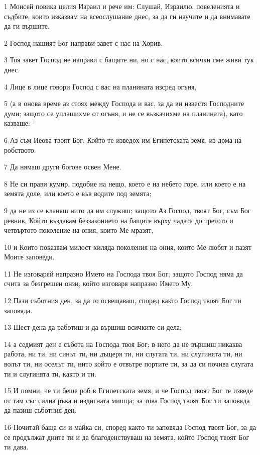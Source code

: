 \par 1 Моисей повика целия Израил и рече им: Слушай, Израилю, повеленията и съдбите, които изказвам на всеослушание днес, за да ги научите и да внимавате да ги вършите.
\par 2 Господ нашият Бог направи завет с нас на Хорив.
\par 3 Тоя завет Господ не направи с бащите ни, но с нас, които всички сме живи тук днес.
\par 4 Лице в лице говори Господ с вас на планината изсред огъня,
\par 5 (а в онова време аз стоях между Господа и вас, за да ви известя Господните думи; защото се уплашихме от огъня, и не се възкачихме на планината), като казваше: -
\par 6 Аз съм Иеова твоят Бог, Който те изведох им Египетската земя, из дома на робството.
\par 7 Да нямаш други богове освен Мене.
\par 8 Не си прави кумир, подобие на нещо, което е на небето горе, или което е на земята доле, или което е във водите под земята;
\par 9 да не из се кланяш нито да им служиш; защото Аз Господ, твоят Бог, съм Бог ревнив, Който въздавам беззаконието на бащите върху чадата до третото и четвъртото поколение на ония, които Ме мразят,
\par 10 и Които показвам милост хиляда поколения на ония, които Ме любят и пазят Моите заповеди.
\par 11 Не изговаряй напразно Името на Господа твоя Бог; защото Господ няма да счита за безгрешен онзи, който изговаря напразно Името Му.
\par 12 Пази съботния ден, за да го освещаваш, според както Господ твоят Бог ти заповяда.
\par 13 Шест дена да работиш и да вършиш всичките си дела;
\par 14 а седмият ден е събота на Господа твоя Бог; в него да не вършиш никаква работа, ни ти, ни синът ти, ни дъщеря ти, ни слугата ти, ни слугинята ти, ни волът ти, ни оселът ти, нито който е отвътре портите ти, за да си почива слугата ти и слугинята ти, както и ти.
\par 15 И помни, че ти беше роб в Египетската земя, и че Господ твоят Бог те изведе от там със силна ръка и издигната мишца; за това Господ твоят Бог ти заповяда да пазиш съботния ден.
\par 16 Почитай баща си и майка си, според както ти заповяда Господ твоят Бог, за да се продължат дните ти и да благоденствуваш на земята, който Господ твоят Бог ти дава.
